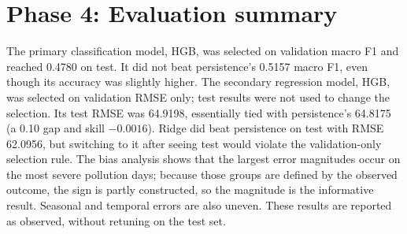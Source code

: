 

\section{Phase 4: Evaluation summary}

The primary classification model, HGB, was selected on validation macro F1 and reached 0.4780 on test. It did not beat persistence's 0.5157 macro F1, even though its accuracy was slightly higher. The secondary regression model, HGB, was selected on validation RMSE only; test results were not used to change the selection. Its test RMSE was 64.9198, essentially tied with persistence's 64.8175 (a 0.10 gap and skill $-0.0016$). Ridge did beat persistence on test with RMSE 62.0956, but switching to it after seeing test would violate the validation-only selection rule. The bias analysis shows that the largest error magnitudes occur on the most severe pollution days; because those groups are defined by the observed outcome, the sign is partly constructed, so the magnitude is the informative result. Seasonal and temporal errors are also uneven. These results are reported as observed, without retuning on the test set.
